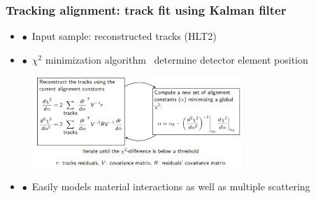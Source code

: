 \documentclass[aspectratio=1610, 12pt, xcolor=dvipsnames]{beamer}
\begin{document}
\begin{frame}\frametitle{Tracking alignment: track fit using Kalman filter}
  \begin{itemize}
    \item $\bullet$\, Input sample: reconstructed tracks (HLT2)
    \item $\bullet$\, $\chi^2$ minimization algorithm \to\, determine detector element position
  \end{itemize}
  \begin{figure}
    \centering
    \includegraphics[width=0.7\textwidth]{plots/kalman_real.png}
  \end{figure}
  \begin{itemize}
    \item $\bullet$\, Easily models material interactions as well as multiple scattering
  \end{itemize}
\end{frame}
\end{document}
